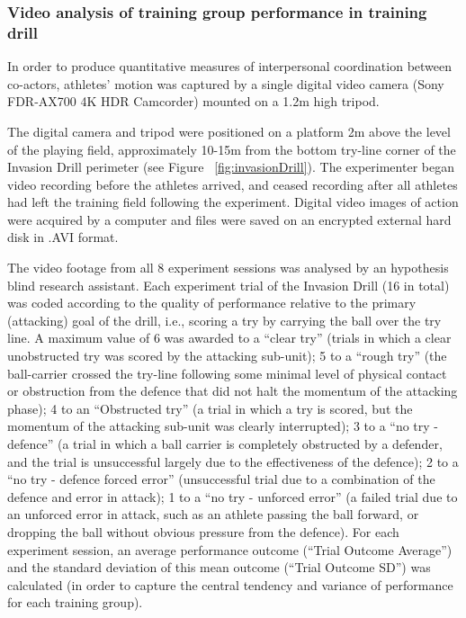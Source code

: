 \subsubsection{Video analysis of training group performance in training drill}
In order to produce quantitative measures of interpersonal coordination between co-actors, athletes’ motion was captured by a single digital video camera (Sony FDR-AX700 4K HDR Camcorder) mounted on a 1.2m high tripod.

The digital camera and tripod were positioned on a platform 2m above the level of the playing field, approximately 10-15m from the bottom try-line corner of the Invasion Drill perimeter (see Figure ~\ref{fig:invasionDrill}). The experimenter began video recording before the athletes arrived, and ceased recording after all athletes had left the training field following the experiment. Digital video images of action were acquired by a computer and files were saved on an encrypted external hard disk in .AVI format.


The video footage from all 8 experiment sessions was analysed by an hypothesis blind research assistant.  Each experiment trial of the Invasion Drill (16 in total) was coded according to the quality of performance relative to the primary (attacking) goal of the drill, i.e., scoring a try by carrying the ball over the try line.  A maximum value of 6 was awarded to a ``clear try'' (trials in which a clear unobstructed try was scored by the attacking sub-unit); 5 to a ``rough try'' (the ball-carrier crossed the try-line following some minimal level of physical contact or obstruction from the defence that did not halt the momentum of the attacking phase); 4 to an ``Obstructed try'' (a trial in which a try is scored, but the momentum of the attacking sub-unit was clearly interrupted); 3 to a ``no try - defence'' (a trial in which a ball carrier is completely obstructed by a defender, and the trial is unsuccessful largely due to the effectiveness of the defence); 2 to a ``no try - defence forced error'' (unsuccessful trial due to a combination of the defence and error in attack); 1 to a ``no try - unforced error'' (a failed trial due to an unforced error in attack, such as an athlete passing the ball forward, or dropping the ball without obvious pressure from the defence).  For each experiment session, an average performance outcome (``Trial Outcome Average'') and the standard deviation of this mean outcome (``Trial Outcome SD'') was calculated (in order to capture the central tendency and variance of performance for each training group).


